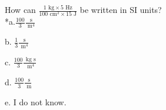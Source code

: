 
How can $\frac{1\text{ kg} \times 5\text{ Hz}}{100\text{ cm}^{2} \times 15\text{ J}}$ be written in SI units?\\

*a.$\frac{100}{3}\frac{\text{ s}}{\text{ m}^{4}}$

b. $\frac{1}{3}\frac{\text{ s}}{\text{ m}^{4}}$

c. $\frac{100}{3}\frac{\text{ kg}\text{ s}}{\text{ m}^{4}}$

d. $\frac{100}{3}\frac{\text{ s}}{\text{ m}}$

e. I do not know.\\
